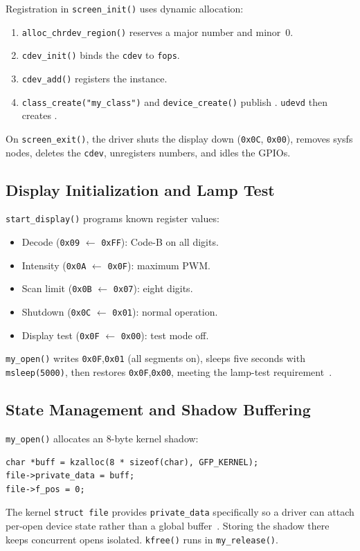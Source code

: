 \documentclass[conference,a4paper]{IEEEtran}
\begin{document}
Registration in \texttt{screen\_init()} uses dynamic allocation:
\begin{enumerate}
    \item \texttt{alloc\_chrdev\_region()} reserves a major number and minor~0.
    \item \texttt{cdev\_init()} binds the \texttt{cdev} to \texttt{fops}.
    \item \texttt{cdev\_add()} registers the instance.
    \item \texttt{class\_create("my\_class")} and \texttt{device\_create()} publish . \texttt{udevd} then creates .
\end{enumerate}

On \texttt{screen\_exit()}, the driver shuts the display down (\texttt{0x0C}, \texttt{0x00}), removes sysfs nodes, deletes the \texttt{cdev}, unregisters numbers, and idles the GPIOs.

\subsection{Display Initialization and Lamp Test}

\texttt{start\_display()} programs known register values:
\begin{itemize}
    \item Decode (\texttt{0x09} $\leftarrow$ \texttt{0xFF}): Code-B on all digits.
    \item Intensity (\texttt{0x0A} $\leftarrow$ \texttt{0x0F}): maximum PWM.
    \item Scan limit (\texttt{0x0B} $\leftarrow$ \texttt{0x07}): eight digits.
    \item Shutdown (\texttt{0x0C} $\leftarrow$ \texttt{0x01}): normal operation.
    \item Display test (\texttt{0x0F} $\leftarrow$ \texttt{0x00}): test mode off.
\end{itemize}

\texttt{my\_open()} writes \texttt{0x0F},\texttt{0x01} (all segments on), sleeps five seconds with \texttt{msleep(5000)}, then restores \texttt{0x0F},\texttt{0x00}, meeting the lamp-test requirement~\cite{acs2026}.

\subsection{State Management and Shadow Buffering}

\texttt{my\_open()} allocates an 8-byte kernel shadow:
\begin{lstlisting}
char *buff = kzalloc(8 * sizeof(char), GFP_KERNEL);
file->private_data = buff;
file->f_pos = 0;
\end{lstlisting}
The kernel \texttt{struct file} provides \texttt{private\_data} specifically so a driver can attach per-open device state rather than a global buffer~\cite{lklabs}. Storing the shadow there keeps concurrent opens isolated. \texttt{kfree()} runs in \texttt{my\_release()}.
\end{document}
